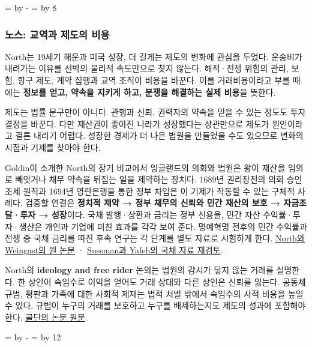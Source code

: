 \documentclass[10pt,a4paper]{article}
\newcommand{\ReserveQuestionSpace}{%
  \par\begingroup
  \dimen0=\pagegoal \advance\dimen0 by -\pagetotal
  \dimen2=\baselineskip \multiply\dimen2 by 12
  \ifdim\dimen0<\dimen2 \newpage\fi
  \endgroup}
\newcommand{\ReserveReadingSectionSpace}{%
  \par\begingroup
  \dimen0=\pagegoal \advance\dimen0 by -\pagetotal
  \dimen2=\baselineskip \multiply\dimen2 by 8
  \ifdim\dimen0<\dimen2 \newpage\fi
  \endgroup}
\begin{document}
\ReserveReadingSectionSpace
\subsubsection*{노스: 교역과 제도의 비용}

North는 19세기 해운과 미국 성장, 더 길게는 제도의 변화에 관심을 두었다. 운송비가 내려가는 이유를 선박의 물리적 속도만으로 찾지 않는다. 해적·전쟁 위험의 관리, 보험, 항구 제도, 계약 집행과 교역 조직이 비용을 바꾼다. 이를 거래비용이라고 부를 때에는 \textbf{정보를 얻고, 약속을 지키게 하고, 분쟁을 해결하는 실제 비용}을 뜻한다.\par

제도는 법률 문구만이 아니다. 관행과 신뢰, 권력자의 약속을 믿을 수 있는 정도도 투자 결정을 바꾼다. 다만 재산권이 좋아진 나라가 성장했다는 상관만으로 제도가 원인이라고 결론 내리기 어렵다. 성장한 경제가 더 나은 법원을 만들었을 수도 있으므로 변화의 시점과 기제를 찾아야 한다.\par

Goldin이 소개한 North의 장기 비교에서 잉글랜드의 의회와 법원은 왕이 재산을 임의로 빼앗거나 채무 약속을 뒤집는 일을 제약하는 장치다. 1689년 권리장전의 의회 승인 조세 원칙과 1694년 영란은행을 통한 정부 차입은 이 기제가 작동할 수 있는 구체적 사례다. 검증할 연결은 \textbf{정치적 제약 → 정부 채무의 신뢰와 민간 재산의 보호 → 자금조달·투자 → 성장}이다. 국채 발행·상환과 금리는 정부 신용을, 민간 자산 수익률·투자·생산은 개인과 기업에 미친 효과를 각각 보여 준다. 명예혁명 전후의 민간 수익률과 전쟁 중 국채 금리를 따진 후속 연구는 각 단계를 별도 자료로 시험하게 한다. \href{https://cdn-dev.vanderbilt.edu/t2-my-dev/wp-content/uploads/sites/138/2016/12/NorthWeingast-1989-Constitutions-and-Commitment.pdf}{North와 Weingast의 원 논문} · \href{https://economichistory.ucla.edu/wp-content/uploads/sites/69/2017/07/sussman\_and\_yafeh\_2006.pdf}{Sussman과 Yafeh의 국채 자료 재검토}.\par

North의 \textbf{ideology and free rider} 논의는 법원의 감시가 닿지 않는 거래를 설명한다. 한 상인이 속임수로 이익을 얻어도 거래 상대와 다른 상인은 신뢰를 잃는다. 공동체 규범, 평판과 가족에 대한 사회적 제재는 법적 처벌 밖에서 속임수의 사적 비용을 높일 수 있다. 규범이 누구의 거래를 보호하고 누구를 배제하는지도 제도의 성과에 포함해야 한다. \href{https://goldin.scholars.harvard.edu/sites/g/files/omnuum5966/files/goldin/files/cliometrics.pdf}{골딘의 논문 원문}.\par

\ReserveQuestionSpace
\end{document}
